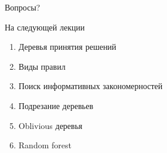 \documentclass[10pt]{beamer}
\begin{document}
\begin{frame}[standout]
  Вопросы?
\end{frame}

\appendix

\begin{frame}{На следующей лекции}
  	\begin{enumerate} [--]
		\item Деревья принятия решений
		\item Виды правил
		\item Поиск информативных закономерностей		
		\item Подрезание деревьев	
		\item Oblivious деревья
		\item Random forest
	\end{enumerate}
\end{frame}
\end{document}
